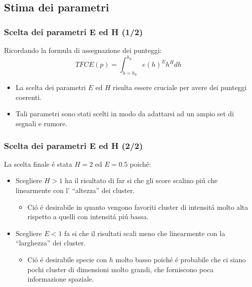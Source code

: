 \documentclass{beamer}
\begin{document}
\subsection{Stima dei parametri}

\begin{frame}
\frametitle{Scelta dei parametri E ed H (1/2)}
Ricordando la formula di assegnazione dei punteggi:
$$TFCE(p)=\int_{h=h_0}^{h_p}e(h)^E h^H dh$$
\begin{itemize}
\item La scelta dei parametri $E$ ed $H$ risulta essere cruciale per avere dei punteggi coerenti.

\item Tali parametri sono stati scelti in modo da adattarsi ad un ampio set di segnali e rumore.

\end{itemize}
\end{frame}

\begin{frame}
\frametitle{Scelta dei parametri E ed H (2/2)}
La scelta finale \'e stata $H = 2$ ed $E = 0.5$ poich\'e:
\bigskip
\begin{itemize}

\item Scegliere $H > 1$ ha il risultato di far si che gli score scalino pi\'u che linearmente con l' ``altezza'' dei cluster.
\begin{itemize}
\item Ci\'o \'e desirabile in quanto vengono favoriti cluster di intensit\'a molto alta rispetto a quelli con intensit\'a pi\'u bassa.
\end{itemize}
\medskip
\item Scegliere $E < 1$ fa si che il risultati scali meno che linearmente con la ``larghezza'' dei cluster.
\begin{itemize}
\item Ci\'o \'e desirabile specie con $h$ molto basso poich\'e \'e probabile che ci siano pochi cluster di dimensioni molto grandi, che forniscono poca informazione spaziale.
\end{itemize}


\end{itemize}
\end{frame}
\end{document}
